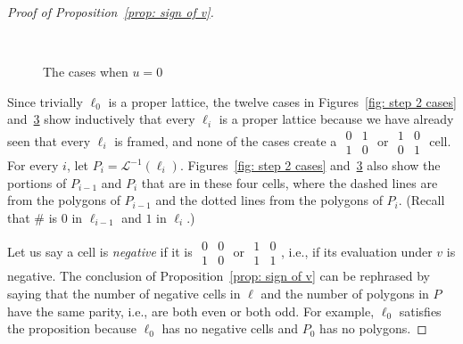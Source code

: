 \documentclass[12pt]{article}
\theoremstyle{plain}
\theoremstyle{remark}
\theoremstyle{definition}
\theoremstyle{remark}
\theoremstyle{definition}
\newcommand{\cellC}[4]{ \draw[thick] ( #1 , #2 ) rectangle ( #3 , #4 ); \draw[red, thick, densely dotted] (#3 * 0.5 + #1 * 0.5 , #4) -- (#3, #4 * 0.5 + #2 * 0.5);}
\newcommand{\cellD}[4]{ \draw[thick] ( #1 , #2 ) rectangle ( #3 , #4 ); \draw[red, thick, densely dotted] (#3 * 0.5 + #1 * 0.5 , #4) -- (#1, #4 * 0.5 + #2 * 0.5);}
\newcommand{\cellE}[4]{ \draw[thick] ( #1 , #2 ) rectangle ( #3 , #4 ); \draw[red, thick, densely dotted] (#3, #4 * 0.5 + #2 * 0.5) -- (#1, #4 * 0.5 + #2 * 0.5);}
\newcommand{\cellCa}[4]{ \draw[thick] ( #1 , #2 ) rectangle ( #3 , #4 ); \draw[blue, thick, dashed] (#3 * 0.5 + #1 * 0.5 , #4) -- (#3, #4 * 0.5 + #2 * 0.5);}
\newcommand{\cellDa}[4]{ \draw[thick] ( #1 , #2 ) rectangle ( #3 , #4 ); \draw[blue, thick, dashed] (#3 * 0.5 + #1 * 0.5 , #4) -- (#1, #4 * 0.5 + #2 * 0.5);}
\newcommand{\cellFa}[4]{ \draw[thick] ( #1 , #2 ) rectangle ( #3 , #4 ); \draw[blue, thick, dashed] (#3 * 0.5 + #1 * 0.5 , #2) -- (#3 * 0.5 + #1 * 0.5 , #4);}
\newcommand{\lablnode}[3]{\node[shape=circle,draw=none,fill=none, inner sep=0pt,minimum size=0pt] (A) at ( #1 , #2 ) {#3};}
\newcommand{\lablvertex}[3]{\node[shape=circle,draw=none,fill=white, inner sep=2pt,minimum size=5pt] (A) at ( #1 , #2 ) {#3};}
\begin{document}
\begin{proof}[Proof of Proposition~\ref{prop: sign of v}]
\begin{figure}[h!]
\begin{subfigure}[t]{0.2\textwidth}
\begin{center}
\end{center}
\label{subfig: bit flip case 5}
\end{subfigure}
~
\begin{subfigure}[t]{0.2\textwidth}
\begin{center}
\end{center}
\label{subfig: bit flip case 6}
\end{subfigure}
\caption{The cases when $u=0$}
\label{fig: step 3 cases}
\end{figure}

Since trivially $\ell_{0}$ is a proper lattice, the twelve cases in Figures~\ref{fig: step 2 cases} and~\ref{fig: step 3 cases} show inductively that every $\ell_{i}$ is a proper lattice because we have already seen that every $\ell_i$ is framed, and none of the cases create a $\begin{smallmatrix} 0 & 1 \\ 1 & 0 \end{smallmatrix}$ or $\begin{smallmatrix} 1 & 0 \\ 0 & 1 \end{smallmatrix}$ cell. For every $i$, let $P_{i}=\mathscr{L}^{-1}\left(\ell_{i}\right)$. Figures~\ref{fig: step 2 cases} and~\ref{fig: step 3 cases} also show the portions of $P_{i-1}$ and $P_{i}$ that are in these four cells, where the dashed lines are from the polygons of $P_{i-1}$ and the dotted lines from the polygons of $P_{i}$. (Recall that $\#$ is $0$ in $\ell_{i-1}$ and $1$ in $\ell_{i}$.)

Let us say a cell is \emph{negative} if it is $\begin{smallmatrix} 0 & 0 \\ 1 & 0 \end{smallmatrix}$ or $\begin{smallmatrix} 1 & 0 \\ 1 & 1 \end{smallmatrix}$, i.e., if its evaluation under $v$ is negative. The conclusion of Proposition~\ref{prop: sign of v} can be rephrased by saying that the number of negative cells in $\ell$ and the number of polygons in $P$ have the same parity, i.e., are both even or both odd. For example, $\ell_{0}$ satisfies the proposition because $\ell_{0}$ has no negative cells and $P_{0}$ has no polygons.


\end{proof}
\end{document}
